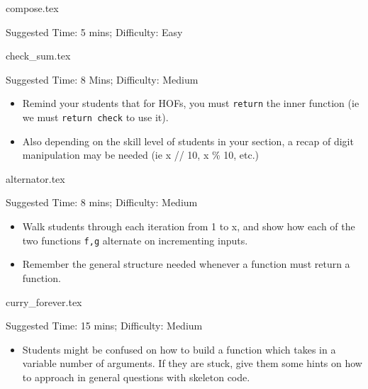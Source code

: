 \documentclass{exam}
\begin{document}
\begin{questions}
    {compose.tex}
    \begin{questionmeta}
        Suggested Time: 5 mins; Difficulty: Easy
    \end{questionmeta}

    {check_sum.tex}
    \begin{questionmeta}
        Suggested Time: 8 Mins; Difficulty: Medium
        \begin{itemize}
            \item Remind your students that for HOFs, you must \lstinline{return} the inner function (ie we must \lstinline{return check} to use it).
            \item Also depending on the skill level of students in your section, a recap of digit manipulation may be needed (ie x // 10, x \% 10, etc.)
        \end{itemize}
    \end{questionmeta}

    {alternator.tex}
    \begin{questionmeta}
        Suggested Time: 8 mins; Difficulty: Medium
        \begin{itemize}
            \item Walk students through each iteration from 1 to x, and show how each of the two functions \verb|f,g| alternate on incrementing inputs.
            \item Remember the general structure needed whenever a function must return a function.
        \end{itemize}
    \end{questionmeta}

    {curry_forever.tex}
    \begin{questionmeta}
        Suggested Time: 15 mins; Difficulty: Medium
        \begin{itemize}
        \item Students might be confused on how to build a function which takes in a variable number of arguments. If they are stuck, give them some hints on how to approach in general questions with skeleton code.
        \end{itemize}
    \end{questionmeta}
\end{questions}
\end{document}
